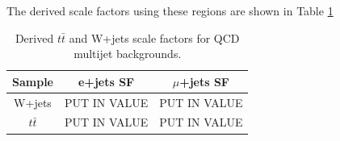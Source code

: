 The derived scale factors using these regions are shown in Table \ref{tab:CR12SFs}
\begin{table}[h]
\begin{center}
{\renewcommand{\arraystretch}{1.2}
\begin{tabular}{ccc}
\hline
Sample     &  e+jets SF   & $\mu$+jets SF  \\  \hline 
W+jets    &  PUT IN VALUE   & PUT IN VALUE	\\
$t\bar{t}$  &  PUT IN VALUE    &  PUT IN VALUE	\\ \hline
\end{tabular}
\caption{Derived $t\bar{t}$ and W+jets scale factors for QCD multijet backgrounds.  }
\label{tab:CR12SFs}
}
\end{center}
\end{table}


